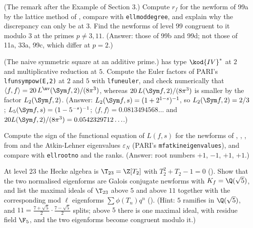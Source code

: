 \begin{exercise}\label{ex:hecke:ex-99}
(The remark after the Example of Section 3.) Compute $r_f$ for the newform of 99a by the lattice method of , compare with \texttt{ellmoddegree}, and explain why
the discrepancy can only be at $3$. Find the newforms of level $99$ congruent to it modulo $3$ at the primes $p\ne3,11$. (Answer: those of 99b and 99d; not those of 11a, 33a, 99c, which differ at $p=2$.)
\end{exercise}

\begin{exercise}\label{ex:hecke:ex-rankin}
(The naive symmetric square at an additive prime.)  has type $\kod{IV}^*$ at $2$ and multiplicative reduction at $5$. Compute the Euler factors of PARI's \texttt{lfunsympow(E,2)}
at $2$ and $5$ with \texttt{lfuneuler}, and check numerically that $\langle f,f\rangle=20\,L^{\nv}(\Sym f,2)/(8\pi^3)$, whereas $20\,L(\Sym f,2)/(8\pi^3)$ is smaller by the factor $L_2(\Sym f,2)$.
(Answer: $L_2(\Sym f,s)=(1+2^{1-s})^{-1}$, so $L_2(\Sym f,2)=2/3$; $L_5(\Sym f,s)=(1-5^{-s})^{-1}$; $\langle f,f\rangle=0.0813494568\ldots$ and $20L(\Sym f,2)/(8\pi^3)=0.0542329712\ldots$.)
\end{exercise}

\begin{exercise}\label{ex:hecke:ex-fe}
Compute the sign of the functional equation of $L(f,s)$ for the newforms of , , ,  from  and the Atkin-Lehner eigenvalues
$\varepsilon_N$ (PARI's \texttt{mfatkineigenvalues}), and compare with \texttt{ellrootno} and the ranks. (Answer: root numbers $+1$, $-1$, $+1$, $+1$.)
\end{exercise}

\begin{exercise}\label{ex:hecke:ex-galois23}
At level $23$ the Hecke algebra is $\T_{23}=\Z[T_2]$ with $T_2^2+T_2-1=0$ (). Show that the two normalised eigenforms are Galois conjugate newforms with $K_f=\Q(\sqrt5)$, and list the
maximal ideals of $\T_{23}$ above $5$ and above $11$ together with the corresponding mod $\ell$ eigenforms $\sum\phi(T_n)q^n$ (). (Hint: $5$ ramifies in $\Q(\sqrt5)$, and
$11=\frac{7+\sqrt5}2\cdot\frac{7-\sqrt5}2$ splits; above $5$ there is one maximal ideal, with residue field $\F_5$, and the two eigenforms become congruent modulo it.)
\end{exercise}

